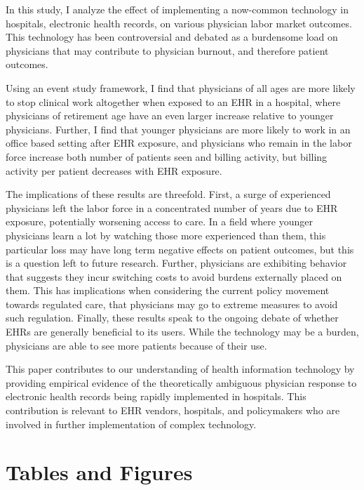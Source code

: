 \documentclass[11pt]{article}
\begin{document}
In this study, I analyze the effect of implementing a now-common technology in hospitals, electronic health records, on various physician labor market outcomes. This technology has been controversial and debated as a burdensome load on physicians that may contribute to physician burnout, and therefore patient outcomes. 

Using an event study framework, I find that physicians of all ages are more likely to stop clinical work altogether when exposed to an EHR in a hospital, where physicians of retirement age have an even larger increase relative to younger physicians. Further, I find that younger physicians are more likely to work in an office based setting after EHR exposure, and physicians who remain in the labor force increase both number of patients seen and billing activity, but billing activity per patient decreases with EHR exposure. 

The implications of these results are threefold. First, a surge of experienced physicians left the labor force in a concentrated number of years due to EHR exposure, potentially worsening access to care. In a field where younger physicians learn a lot by watching those more experienced than them, this particular loss may have long term negative effects on patient outcomes, but this is a question left to future research. Further, physicians are exhibiting behavior that suggests they incur switching costs to avoid burdens externally placed on them. This has implications when considering the current policy movement towards regulated care, that physicians may go to extreme measures to avoid such regulation. Finally, these results speak to the ongoing debate of whether EHRs are generally beneficial to its users. While the technology may be a burden, physicians are able to see more patients because of their use. 

This paper contributes to our understanding of health information technology by providing empirical evidence of the theoretically ambiguous physician response to electronic health records being rapidly implemented in hospitals. This contribution is relevant to EHR vendors, hospitals, and policymakers who are involved in further implementation of complex technology. 



\section{Tables and Figures}
\end{document}

